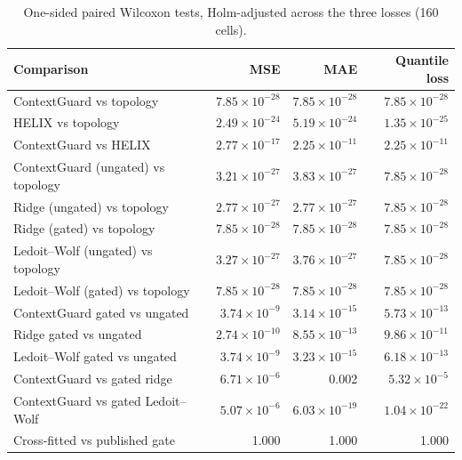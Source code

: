 \begin{table}[H]
\centering
\caption{One-sided paired Wilcoxon tests, Holm-adjusted across the three losses (160 cells).}
\label{tab:s-holm}
\small
\begin{tabular}{lrrr}
\toprule
Comparison & MSE & MAE & Quantile loss \\
\midrule
ContextGuard vs topology & $7.85\times10^{-28}$ & $7.85\times10^{-28}$ & $7.85\times10^{-28}$ \\
HELIX vs topology & $2.49\times10^{-24}$ & $5.19\times10^{-24}$ & $1.35\times10^{-25}$ \\
ContextGuard vs HELIX & $2.77\times10^{-17}$ & $2.25\times10^{-11}$ & $2.25\times10^{-11}$ \\
ContextGuard (ungated) vs topology & $3.21\times10^{-27}$ & $3.83\times10^{-27}$ & $7.85\times10^{-28}$ \\
Ridge (ungated) vs topology & $2.77\times10^{-27}$ & $2.77\times10^{-27}$ & $7.85\times10^{-28}$ \\
Ridge (gated) vs topology & $7.85\times10^{-28}$ & $7.85\times10^{-28}$ & $7.85\times10^{-28}$ \\
Ledoit--Wolf (ungated) vs topology & $3.27\times10^{-27}$ & $3.76\times10^{-27}$ & $7.85\times10^{-28}$ \\
Ledoit--Wolf (gated) vs topology & $7.85\times10^{-28}$ & $7.85\times10^{-28}$ & $7.85\times10^{-28}$ \\
ContextGuard gated vs ungated & $3.74\times10^{-9}$ & $3.14\times10^{-15}$ & $5.73\times10^{-13}$ \\
Ridge gated vs ungated & $2.74\times10^{-10}$ & $8.55\times10^{-13}$ & $9.86\times10^{-11}$ \\
Ledoit--Wolf gated vs ungated & $3.74\times10^{-9}$ & $3.23\times10^{-15}$ & $6.18\times10^{-13}$ \\
ContextGuard vs gated ridge & $6.71\times10^{-6}$ & 0.002 & $5.32\times10^{-5}$ \\
ContextGuard vs gated Ledoit--Wolf & $5.07\times10^{-6}$ & $6.03\times10^{-19}$ & $1.04\times10^{-22}$ \\
Cross-fitted vs published gate & 1.000 & 1.000 & 1.000 \\
\bottomrule
\end{tabular}
\end{table}
